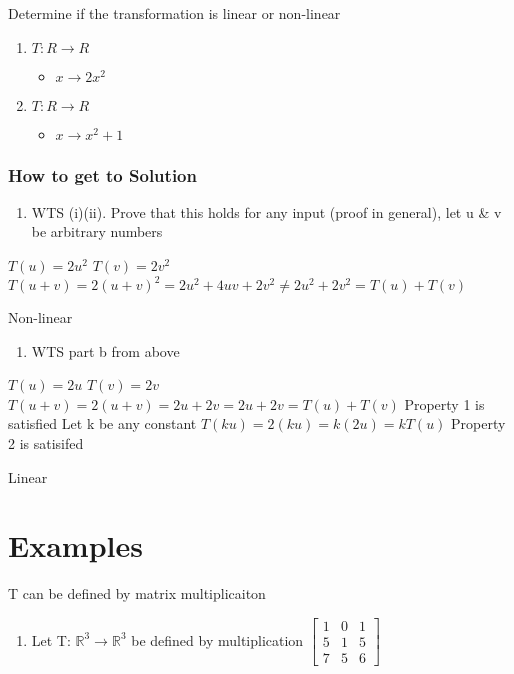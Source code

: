 \documentclass[11pt]{article}
\begin{document}
Determine if the transformation is linear or non-linear
\begin{enumerate}
\item \(T: R \rightarrow{} R\)
\begin{itemize}
\item \(x \rightarrow{} 2x^{2}\)
\end{itemize}
\item \(T: R \rightarrow{} R\)
\begin{itemize}
\item \(x \rightarrow{} x^{2} + 1\)
\end{itemize}
\end{enumerate}
\subsubsection{How to get to Solution}
\label{sec:orge126a43}
\begin{enumerate}
\item WTS (i)(ii). Prove that this holds for any input (proof in general), let u \& v be arbitrary numbers
\end{enumerate}
\(T(u) = 2u^{2}\)
\(T(v) = 2v^{2}\)
\(T(u+v) = 2(u+v)^{2} = 2u^{2} + 4uv + 2v^{2} \neq 2u^{2} + 2v^{2} = T(u) + T(v)\)

Non-linear

\begin{enumerate}
\item WTS part b from above
\end{enumerate}
\(T(u) = 2u\)
\(T(v) = 2v\)
\(T(u+v) = 2(u+v) = 2u + 2v = 2u + 2v = T(u) + T(v)\)
Property 1 is satisfied
Let k be any constant
\(T(ku) = 2(ku) = k(2u) = kT(u)\)
Property 2 is satisifed

Linear
\section{Examples}
\label{sec:org61251d6}
T can be defined by matrix multiplicaiton
\begin{enumerate}
\item Let T: \(\mathbb{R}^{3} \rightarrow{} \mathbb{R}^{3}\) be defined by multiplication \(\begin{bmatrix}1&0&1\\5&1&5\\7&5&6\end{bmatrix}\)
\end{enumerate}
\end{document}

